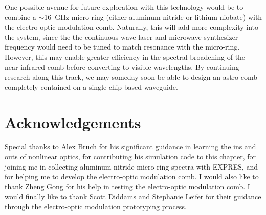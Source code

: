One possible avenue for future exploration with this technology would be to combine a $\sim$16~\si{\giga\hertz} micro-ring (either aluminum nitride or lithium niobate) with the electro-optic modulation comb. Naturally, this will add more complexity into the system, since the the continuous-wave laser and microwave-synthesizer frequency would need to be tuned to match resonance with the micro-ring. However, this may enable greater efficiency in the spectral broadening of the near-infrared comb before converting to visible wavelengths. By continuing research along this track, we may someday soon be able to design an astro-comb completely contained on a single chip-based waveguide.

\section*{Acknowledgements}

Special thanks to Alex Bruch for his significant guidance in learning the ins and outs of nonlinear optics, for contributing his simulation code to this chapter, for joining me in collecting aluminum-nitride micro-ring spectra with EXPRES, and for helping me to develop the electro-optic modulation comb. I would also like to thank Zheng Gong for his help in testing the electro-optic modulation comb. I would finally like to thank Scott Diddams and Stephanie Leifer for their guidance through the electro-optic modulation prototyping process.